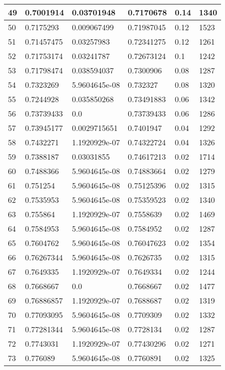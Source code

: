 \begin{longtable}{|l|l|l|l|l|l|}
49 & 0.7001914 & 0.03701948 & 0.7170678 & 0.14 & 1340 \\ \hline 
50 & 0.7175293 & 0.009067499 & 0.71987045 & 0.12 & 1523 \\ \hline 
51 & 0.71457475 & 0.03257983 & 0.72341275 & 0.12 & 1261 \\ \hline 
52 & 0.71753174 & 0.03241787 & 0.72673124 & 0.1 & 1242 \\ \hline 
53 & 0.71798474 & 0.038594037 & 0.7300906 & 0.08 & 1287 \\ \hline 
54 & 0.7323269 & 5.9604645e-08 & 0.732327 & 0.08 & 1320 \\ \hline 
55 & 0.7244928 & 0.035850268 & 0.73491883 & 0.06 & 1342 \\ \hline 
56 & 0.73739433 & 0.0 & 0.73739433 & 0.06 & 1286 \\ \hline 
57 & 0.73945177 & 0.0029715651 & 0.7401947 & 0.04 & 1292 \\ \hline 
58 & 0.7432271 & 1.1920929e-07 & 0.74322724 & 0.04 & 1326 \\ \hline 
59 & 0.7388187 & 0.03031855 & 0.74617213 & 0.02 & 1714 \\ \hline 
60 & 0.7488366 & 5.9604645e-08 & 0.74883664 & 0.02 & 1279 \\ \hline 
61 & 0.751254 & 5.9604645e-08 & 0.75125396 & 0.02 & 1315 \\ \hline 
62 & 0.7535953 & 5.9604645e-08 & 0.75359523 & 0.02 & 1340 \\ \hline 
63 & 0.755864 & 1.1920929e-07 & 0.7558639 & 0.02 & 1469 \\ \hline 
64 & 0.7584953 & 5.9604645e-08 & 0.7584952 & 0.02 & 1287 \\ \hline 
65 & 0.7604762 & 5.9604645e-08 & 0.76047623 & 0.02 & 1354 \\ \hline 
66 & 0.76267344 & 5.9604645e-08 & 0.7626735 & 0.02 & 1315 \\ \hline 
67 & 0.7649335 & 1.1920929e-07 & 0.7649334 & 0.02 & 1244 \\ \hline 
68 & 0.7668667 & 0.0 & 0.7668667 & 0.02 & 1477 \\ \hline 
69 & 0.76886857 & 1.1920929e-07 & 0.7688687 & 0.02 & 1319 \\ \hline 
70 & 0.77093095 & 5.9604645e-08 & 0.7709309 & 0.02 & 1332 \\ \hline 
71 & 0.77281344 & 5.9604645e-08 & 0.7728134 & 0.02 & 1287 \\ \hline 
72 & 0.7743031 & 1.1920929e-07 & 0.77430296 & 0.02 & 1271 \\ \hline 
73 & 0.776089 & 5.9604645e-08 & 0.7760891 & 0.02 & 1325 \\ \hline 

\end{longtable}
